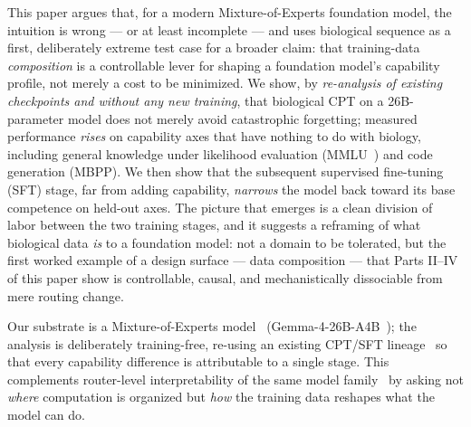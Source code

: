 \documentclass[11pt]{article}
\begin{document}
This paper argues that, for a modern Mixture-of-Experts foundation model, the intuition is
wrong --- or at least incomplete --- and uses biological sequence as a first, deliberately
extreme test case for a broader claim: that training-data \emph{composition} is a controllable
lever for shaping a foundation model's capability profile, not merely a cost to be minimized.
We show, by \emph{re-analysis of existing checkpoints and without any new training}, that
biological CPT on a 26B-parameter model does not merely avoid catastrophic forgetting; measured
performance \emph{rises} on capability axes that have nothing to do with biology, including
general knowledge under likelihood evaluation
(MMLU~\citep{hendrycks2020measuring}) and code generation (MBPP). We then show that
the subsequent supervised fine-tuning (SFT) stage, far from adding capability, \emph{narrows}
the model back toward its base competence on held-out axes. The picture that emerges is a clean
division of labor between the two training stages, and it suggests a reframing of what
biological data \emph{is} to a foundation model: not a domain to be tolerated, but the first
worked example of a design surface --- data composition --- that Parts II--IV of this paper
show is controllable, causal, and mechanistically dissociable from mere routing change.

Our substrate is a Mixture-of-Experts model~\citep{shazeer2017sparse, fedus2022switch,
jiang2024mixtral} (Gemma-4-26B-A4B~\citep{gemmateam2025}); the analysis is deliberately
training-free, re-using an existing CPT/SFT lineage~\citep{ibrahim2024cpt} so that every
capability difference is attributable to a single stage. This complements router-level
interpretability of the same model family~\citep{wang2026omnigene, park2024moeinterpret,
kanai2025moeinterp} by asking not \emph{where} computation is organized but \emph{how} the
training data reshapes what the model can do.
\end{document}
